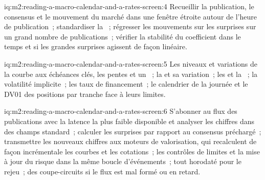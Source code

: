 \begin{solution}{iq:m2:reading-a-macro-calendar-and-a-rates-screen:4}
Recueillir la publication, le consensus et le mouvement du marché dans une fenêtre étroite autour de
l'heure de publication~; standardiser la ~; régresser les mouvements sur les surprises sur un
grand nombre de publications~; vérifier la stabilité du coefficient dans le temps et si les grandes surprises
agissent de façon linéaire.
\end{solution}

\begin{solution}{iq:m2:reading-a-macro-calendar-and-a-rates-screen:5}
Les niveaux et variations de la courbe aux échéances clés, les pentes et un ~; la 
et sa variation~; les  et la ~; la volatilité implicite~; les taux de financement~;
le calendrier de la journée et le DV01 des positions par tranche face à leurs limites.
\end{solution}

\begin{solution}{iq:m2:reading-a-macro-calendar-and-a-rates-screen:6}
S'abonner au flux des publications avec la latence la plus faible disponible et analyser les chiffres
dans des champs standard~; calculer les surprises par rapport au consensus préchargé~; transmettre les nouveaux
chiffres aux moteurs de valorisation, qui recalculent de façon incrémentale les courbes et les cotations~; les contrôles de
limites et la mise à jour du risque dans la même boucle d'événements~; tout horodaté pour le rejeu~; des
coupe-circuits si le flux est mal formé ou en retard.
\end{solution}
